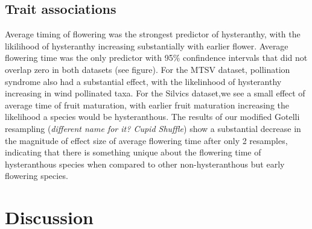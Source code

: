 \documentclass{article}\usepackage[]{graphicx}\usepackage[]{color}
\begin{document}
\subsection*{Trait associations}
Average timing of flowering was the strongest predictor of hysteranthy, with the likilihood of hysteranthy increasing substantially with earlier flower. Average flowering time was the only predictor with 95$\%$ confindence intervals that did not overlap zero in both datasets (see figure). For the MTSV dataset, pollination syndrome also had a substantial effect, with the likelinhood of hysteranthy increasing in wind pollinated taxa. For the Silvics dataset,we see a small effect of average time of fruit maturation, with earlier fruit maturation increasing the likelihood a species would be hysteranthous. The results of our modified Gotelli resampling (\textit{different name for it? Cupid Shuffle}) show a substantial decrease in the magnitude of effect size of average flowering time after only 2 resamples, indicating that there is something unique about the flowering time of hysteranthous species when compared to other non-hysteranthous but early flowering species.
\section*{Discussion}
\end{document}
